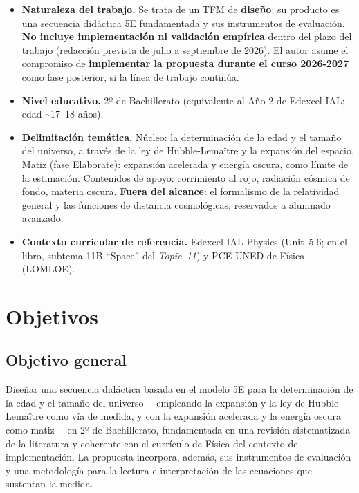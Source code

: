 \begin{itemize}
\item \textbf{Naturaleza del trabajo.} Se trata de un TFM de \textbf{diseño}: su producto es una secuencia didáctica 5E fundamentada y sus instrumentos de evaluación. \textbf{No incluye implementación ni validación empírica} dentro del plazo del trabajo (redacción prevista de julio a septiembre de 2026). El autor asume el compromiso de \textbf{implementar la propuesta durante el curso 2026-2027} como fase posterior, si la línea de trabajo continúa.
\item \textbf{Nivel educativo.} 2º de Bachillerato (equivalente al Año 2 de Edexcel IAL; edad \textasciitilde17--18 años).
\item \textbf{Delimitación temática.} Núcleo: la determinación de la edad y el tamaño del universo, a través de la ley de Hubble-Lemaître y la expansión del espacio. Matiz (fase Elaborate): expansión acelerada y energía oscura, como límite de la estimación. Contenidos de apoyo: corrimiento al rojo, radiación cósmica de fondo, materia oscura. \textbf{Fuera del alcance}: el formalismo de la relatividad general y las funciones de distancia cosmológicas, reservados a alumnado avanzado.
\item \textbf{Contexto curricular de referencia.} Edexcel IAL Physics (Unit~5.6; en el libro, subtema 11B ``Space'' del \textit{Topic~11}) y PCE UNED de Física (LOMLOE).
\end{itemize}

\section{Objetivos}\label{sec:objetivos}

\subsection{Objetivo general}

Diseñar una secuencia didáctica basada en el modelo 5E para la determinación de la edad y el tamaño del universo ---empleando la expansión y la ley de Hubble-Lemaître como vía de medida, y con la expansión acelerada y la energía oscura como matiz--- en 2º de Bachillerato, fundamentada en una revisión sistematizada de la literatura y coherente con el currículo de Física del contexto de implementación. La propuesta incorpora, además, sus instrumentos de evaluación y una metodología para la lectura e interpretación de las ecuaciones que sustentan la medida.

